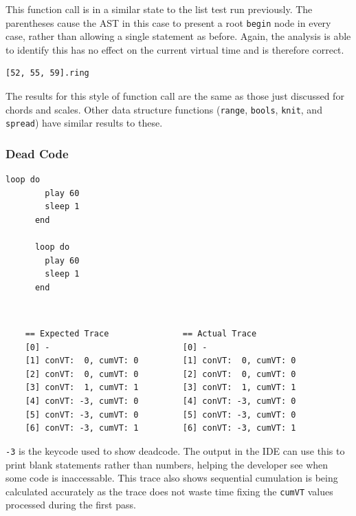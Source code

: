 \documentclass[11pt, abstracton, twoside, titlepage=true]{scrartcl}
\begin{document}
This function call is in a similar state to the list test run previously. The 
parentheses cause the AST in this case to present a root \texttt{begin} node in 
every case, rather than allowing a single statement as before. Again, the analysis 
is able to identify this has no effect on the current virtual time and is therefore 
correct. 

\begin{minipage}{\textwidth}
	\begin{lstlisting}[style = sonicpi]
      [52, 55, 59].ring
	\end{lstlisting}
\end{minipage}

The results for this style of function call are the same as those just discussed 
for chords and scales. Other data structure functions (\texttt{range}, 
\texttt{bools}, \texttt{knit}, and \texttt{spread}) have similar results to 
these.

\subsubsection{Dead Code}
\begin{minipage}{\textwidth}
	\begin{lstlisting}[style = sonicpi]
      loop do
        play 60
        sleep 1
      end

      loop do
        play 60
        sleep 1
      end
	\end{lstlisting}
\end{minipage}
\\
\begin{lstlisting}
    == Expected Trace               == Actual Trace
    [0] -                           [0] -
    [1] conVT:  0, cumVT: 0         [1] conVT:  0, cumVT: 0
    [2] conVT:  0, cumVT: 0         [2] conVT:  0, cumVT: 0
    [3] conVT:  1, cumVT: 1         [3] conVT:  1, cumVT: 1
    [4] conVT: -3, cumVT: 0         [4] conVT: -3, cumVT: 0
    [5] conVT: -3, cumVT: 0         [5] conVT: -3, cumVT: 0
    [6] conVT: -3, cumVT: 1         [6] conVT: -3, cumVT: 1
\end{lstlisting}

\texttt{-3} is the keycode used to show deadcode. The output in the IDE can use 
this to print blank statements rather than numbers, helping the developer see
when some code is inaccessable. This trace also shows sequential cumulation is 
being calculated accurately as the trace does not waste time fixing the 
\texttt{cumVT} values processed during the first pass.
\end{document}
